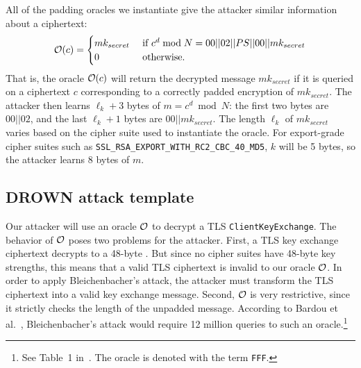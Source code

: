 All of the \ssltwo padding oracles we instantiate give the attacker similar information about a \PKCSconform \ssltwo ciphertext:
\begin{equation*} 
\mathcal{O}(c) =  
\begin{cases} 
mk_{secret} & \text{ if } c^d \bmod N = 00 || 02 || PS || 00 || mk_{secret}  \\ 
0 & \text{ otherwise.} 
\end{cases} 
\end{equation*}
That is, the oracle $\mathcal{O}(c)$ will return the decrypted message $mk_{secret}$ if it is queried on a \PKCSconform \ssltwo ciphertext $c$ corresponding to a correctly \PKCS padded encryption of $mk_{secret}$.  The attacker then learns $\ell_k + 3$ bytes of $m = c^d \bmod N$: the first two bytes are $00 || 02$, and the last $\ell_k+1$ bytes are $00 || mk_{secret}$.  The length $\ell_k$ of $mk_{secret}$ varies based on the cipher suite used to instantiate the oracle.  For export-grade cipher suites such as \texttt{SSL\_RSA\_EXPORT\_WITH\_RC2\_CBC\_40\_MD5},
$k$ will be 5 bytes, so the attacker learns 8 bytes of $m$.

\subsection{DROWN attack template}
\label{sec:adapted-bb-compact}
Our attacker will use an \ssltwo oracle $\mathcal{O}$ to decrypt a TLS \texttt{ClientKeyExchange}.  
The behavior of $\mathcal{O}$ poses two problems for the attacker. First, a TLS key exchange ciphertext decrypts to a 48-byte \pms. But since no \ssltwo cipher suites have 48-byte key strengths, this means that a valid TLS ciphertext is invalid to our oracle $\mathcal{O}$. 
In order to apply Bleichenbacher's attack, the attacker must transform the TLS ciphertext into a valid \ssltwo key exchange message. Second, $\mathcal{O}$ is very restrictive, since it strictly checks the length of the unpadded message. 
According to Bardou et al.~\cite{efficient-padding-oracle-2012}, Bleichenbacher's attack would require 12 million queries to such an oracle.\footnote{See Table~1 in~\cite{efficient-padding-oracle-2012}. The oracle is denoted with the term \texttt{FFF}.} 

